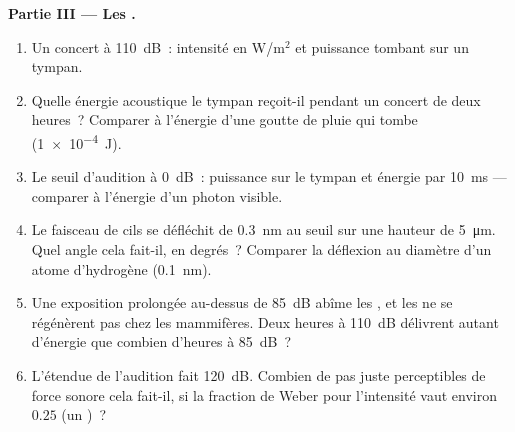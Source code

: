 \begin{problem}
\medskip
\noindent\textbf{Partie III --- Les .}
\begin{enumerate}[resume]
  \item Un concert à \qty{110}{dB}~: intensité en W/m$^{2}$ et puissance
        tombant sur un tympan.
  \item Quelle énergie acoustique le tympan reçoit-il pendant un concert
        de deux heures~? Comparer à l'énergie d'une goutte de pluie qui
        tombe (\qty{1e-4}{J}).
  \item Le seuil d'audition à \qty{0}{dB}~: puissance sur le tympan et
        énergie par \qty{10}{ms} --- comparer à l'énergie d'un photon
        visible.
  \item Le faisceau de cils se défléchit de \qty{0.3}{nm} au seuil sur
        une hauteur de \qty{5}{\micro m}. Quel angle cela fait-il, en
        degrés~? Comparer la déflexion au diamètre d'un atome
        d'hydrogène (\qty{0.1}{nm}).
  \item Une exposition prolongée au-dessus de \qty{85}{dB} abîme les
        , et les  ne se régénèrent pas
        chez les mammifères. Deux heures à \qty{110}{dB} délivrent autant
        d'énergie que combien d'heures à \qty{85}{dB}~?
  \item L'étendue de l'audition fait \qty{120}{dB}. Combien de pas juste
        perceptibles de force sonore cela fait-il, si la fraction de
        Weber pour l'intensité vaut environ $0.25$ (un )~?
\end{enumerate}


\end{problem}
